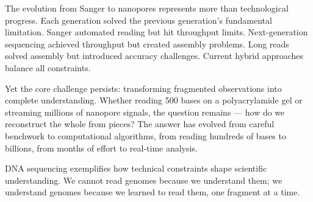 The evolution from Sanger to nanopores represents more than technological progress. Each generation solved the previous generation's fundamental limitation. Sanger automated reading but hit throughput limits. Next-generation sequencing achieved throughput but created assembly problems. Long reads solved assembly but introduced accuracy challenges. Current hybrid approaches balance all constraints.

Yet the core challenge persists: transforming fragmented observations into complete understanding. Whether reading 500 bases on a polyacrylamide gel or streaming millions of nanopore signals, the question remains — how do we reconstruct the whole from pieces? The answer has evolved from careful benchwork to computational algorithms, from reading hundreds of bases to billions, from months of effort to real-time analysis.

DNA sequencing exemplifies how technical constraints shape scientific understanding. We cannot read genomes because we understand them; we understand genomes because we learned to read them, one fragment at a time.
